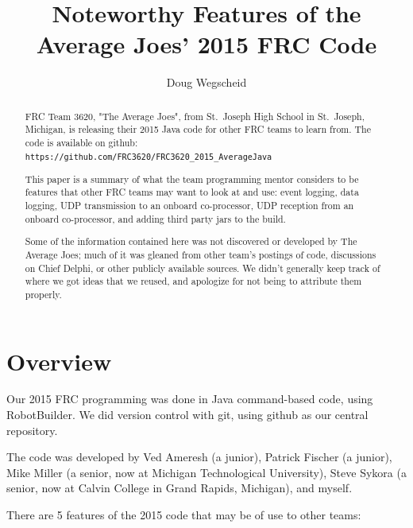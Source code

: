 \documentclass[]{article}
\title{Noteworthy Features of the Average Joes' 2015 FRC Code}
\author{Doug Wegscheid}
\begin{document}
\maketitle

\begin{abstract}

FRC Team 3620, "The Average Joes", from St.\ Joseph High School in St.\ Joseph, Michigan, is releasing their 2015 Java code for other FRC teams to learn from.
The code is available on github:
\\
\texttt{https://github.com/FRC3620/FRC3620\_2015\_AverageJava}

This paper is a summary of what the team programming mentor considers to be features that other FRC teams may want to look at and use: event logging, data logging, UDP transmission to an onboard co-processor, UDP reception from an onboard co-processor, and adding third party jars to the build.

Some of the information contained here was not discovered or developed by The Average Joes; much of it was gleaned from other team's postings of code, discussions on Chief Delphi, or other publicly available sources.
We didn't generally keep track of where we got ideas that we reused, and apologize for not being to  attribute them properly.

\end{abstract}

\section{Overview}

Our 2015 FRC programming was done in Java command-based code, using RobotBuilder.
We did version control with git, using github as our central repository.

The code was developed by Ved Ameresh (a junior), Patrick Fischer (a junior), Mike Miller (a senior, now at Michigan Technological University), Steve Sykora (a senior, now at Calvin College in Grand Rapids, Michigan), and myself.

There are 5 features of the 2015 code that may be of use to other teams:
\end{document}
